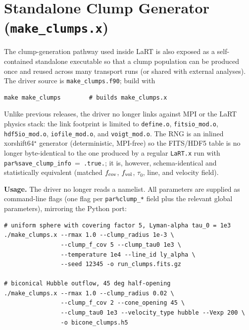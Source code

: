 \documentclass[english,a4paper]{my_memo}
\begin{document}
\section{Standalone Clump Generator (\texttt{make\_clumps.x})}
\label{sec:standalone_make_clumps}

The clump-generation pathway used inside LaRT is also exposed as a
self-contained standalone executable so that a clump population can be
produced once and reused across many transport runs (or shared with
external analyses).  The driver source is \texttt{make\_clumps.f90};
build with

\begin{lstlisting}
make make_clumps        # builds make_clumps.x
\end{lstlisting}

Unlike previous releases, the driver no longer links against MPI or the
LaRT physics stack: the link footprint is limited to \texttt{define.o},
\texttt{fitsio\_mod.o}, \texttt{hdf5io\_mod.o}, \texttt{iofile\_mod.o},
and \texttt{voigt\_mod.o}.  The RNG is an inlined xorshift64$^{\star}$
generator (deterministic, MPI-free) so the FITS/HDF5 table is no longer
byte-identical to the one produced by a regular \texttt{LaRT.x} run with
\texttt{par\%save\_clump\_info}~=~\texttt{.true.}; it is, however,
schema-identical and statistically equivalent (matched $f_{\rm cov}$,
$f_{\rm vol}$, $\tau_0$, line, and velocity field).

\smallskip\noindent\textbf{Usage.}  The driver no longer reads a
namelist.  All parameters are supplied as command-line flags (one flag
per \texttt{par\%clump\_*} field plus the relevant global parameters),
mirroring the Python port:

\begin{lstlisting}
# uniform sphere with covering factor 5, Lyman-alpha tau_0 = 1e3
./make_clumps.x --rmax 1.0 --clump_radius 1e-3 \
                --clump_f_cov 5 --clump_tau0 1e3 \
                --temperature 1e4 --line_id ly_alpha \
                --seed 12345 -o run_clumps.fits.gz

# biconical Hubble outflow, 45 deg half-opening
./make_clumps.x --rmax 1.0 --clump_radius 0.02 \
                --clump_f_cov 2 --cone_opening 45 \
                --clump_tau0 1e3 --velocity_type hubble --Vexp 200 \
                -o bicone_clumps.h5
\end{lstlisting}
\end{document}
